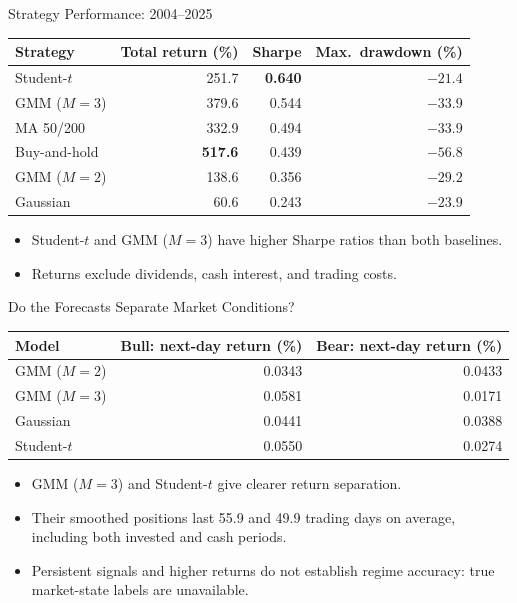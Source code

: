\begin{frame}{Strategy Performance: 2004--2025}
\centering
\small
\begin{tabular}{@{}lrrr@{}}
\toprule
Strategy & Total return (\%) & Sharpe & Max.\ drawdown (\%) \\
\midrule
Student-$t$ & 251.7 & \textbf{0.640} & $-21.4$ \\
GMM ($M=3$) & 379.6 & 0.544 & $-33.9$ \\
MA 50/200 & 332.9 & 0.494 & $-33.9$ \\
Buy-and-hold & \textbf{517.6} & 0.439 & $-56.8$ \\
GMM ($M=2$) & 138.6 & 0.356 & $-29.2$ \\
Gaussian & 60.6 & 0.243 & $-23.9$ \\
\bottomrule
\end{tabular}
\par\medskip
\begin{itemize}
    \item Student-$t$ and GMM ($M=3$) have higher Sharpe ratios than both baselines.
    \item Returns exclude dividends, cash interest, and trading costs.
\end{itemize}
\end{frame}

\begin{frame}{Do the Forecasts Separate Market Conditions?}
\centering
\small
\begin{tabular}{@{}lrr@{}}
\toprule
Model & Bull: next-day return (\%) & Bear: next-day return (\%) \\
\midrule
GMM ($M=2$) & 0.0343 & 0.0433 \\
GMM ($M=3$) & 0.0581 & 0.0171 \\
Gaussian & 0.0441 & 0.0388 \\
Student-$t$ & 0.0550 & 0.0274 \\
\bottomrule
\end{tabular}
\par\medskip
\begin{itemize}
    \item GMM ($M=3$) and Student-$t$ give clearer return separation.
    \item Their smoothed positions last 55.9 and 49.9 trading days on average, including both invested and cash periods.
    \item Persistent signals and higher returns do not establish regime accuracy: true market-state labels are unavailable.
\end{itemize}
\end{frame}


